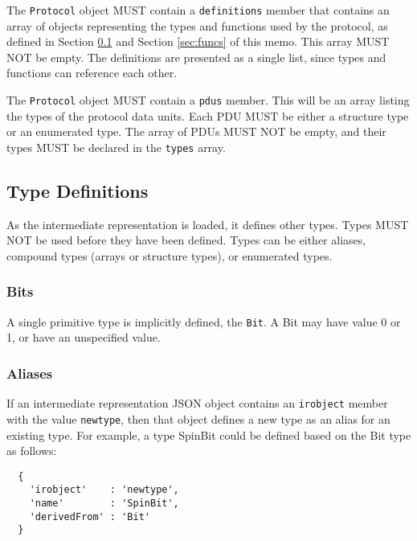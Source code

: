 \documentclass[twocolumn,a4paper]{article}
\begin{document}
The \texttt{Protocol} object MUST contain a \texttt{definitions} member
that contains an array of objects representing the types and functions
used by the protocol, as defined in Section \ref{sec:types} and Section
\ref{sec:funcs} of this memo. This array MUST NOT be empty. The definitions
are presented as a single list, since types and functions can reference
each other.

The \texttt{Protocol} object MUST contain a \texttt{pdus} member. This
will be an array listing the types of the protocol data units. Each PDU
MUST be either a structure type or an enumerated type. The array of PDUs
MUST NOT be empty, and their types MUST be declared in the \texttt{types}
array.

\subsection{Type Definitions}
\label{sec:types}

As the intermediate representation is loaded, it defines other types. Types
MUST NOT be used before they have been defined.
Types can be either aliases, compound types (arrays or structure types), or
enumerated types.

\subsubsection{Bits}

A single primitive type is implicitly defined, the \texttt{Bit}.
A Bit may have value 0 or 1, or have an unspecified value. 

\subsubsection{Aliases}

If an intermediate representation JSON object contains an \texttt{irobject}
member with the value \texttt{newtype}, then that object defines a new type
as an alias for an existing type. For example, a type SpinBit could be
defined based on the Bit type as follows:

\begin{verbatim}
  {
    'irobject'    : 'newtype',
    'name'        : 'SpinBit',
    'derivedFrom' : 'Bit'
  }
\end{verbatim}
\end{document}
